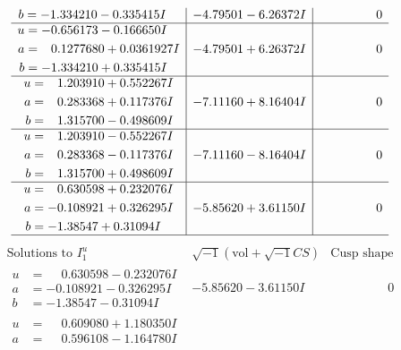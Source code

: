 \documentclass[1p]{elsarticle_modified}
\theoremstyle{definition}
\newcommand{\I}{\sqrt{-1}}
\begin{document}
$$\begin{array}{c|c|c}
\begin{aligned}
b &= -1.334210 - 0.335415 I\end{aligned}
 & -4.79501 - 6.26372 I & \phantom{-0.000000 } 0 \\ \hline\begin{aligned}
u &= -0.656173 - 0.166650 I \\
a &= \phantom{-}0.1277680 + 0.0361927 I \\
b &= -1.334210 + 0.335415 I\end{aligned}
 & -4.79501 + 6.26372 I & \phantom{-0.000000 } 0 \\ \hline\begin{aligned}
u &= \phantom{-}1.203910 + 0.552267 I \\
a &= \phantom{-}0.283368 + 0.117376 I \\
b &= \phantom{-}1.315700 - 0.498609 I\end{aligned}
 & -7.11160 + 8.16404 I & \phantom{-0.000000 } 0 \\ \hline\begin{aligned}
u &= \phantom{-}1.203910 - 0.552267 I \\
a &= \phantom{-}0.283368 - 0.117376 I \\
b &= \phantom{-}1.315700 + 0.498609 I\end{aligned}
 & -7.11160 - 8.16404 I & \phantom{-0.000000 } 0 \\ \hline\begin{aligned}
u &= \phantom{-}0.630598 + 0.232076 I \\
a &= -0.108921 + 0.326295 I \\
b &= -1.38547 + 0.31094 I\end{aligned}
 & -5.85620 + 3.61150 I & \phantom{-0.000000 } 0\\
 \hline 
 \end{array}$$\newpage$$\begin{array}{c|c|c}  
\text{Solutions to }I^u_{1}& \I (\text{vol} + \sqrt{-1}CS) & \text{Cusp shape}\\
 \hline 
\begin{aligned}
u &= \phantom{-}0.630598 - 0.232076 I \\
a &= -0.108921 - 0.326295 I \\
b &= -1.38547 - 0.31094 I\end{aligned}
 & -5.85620 - 3.61150 I & \phantom{-0.000000 } 0 \\ \hline\begin{aligned}
u &= \phantom{-}0.609080 + 1.180350 I \\
a &= \phantom{-}0.596108 - 1.164780 I \\

\end{aligned}
\end{array}$$
\end{document}
